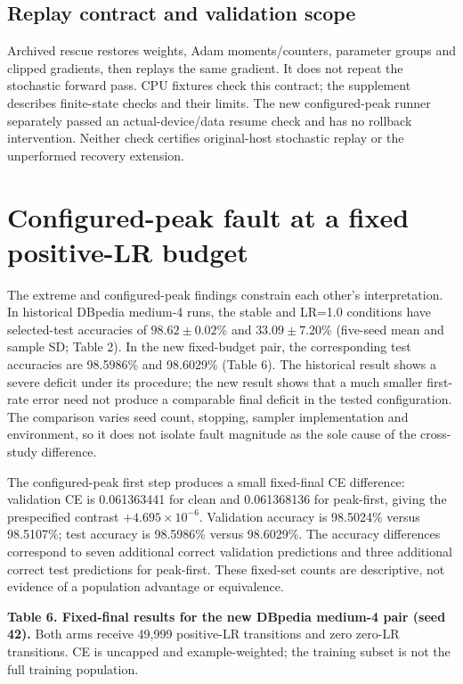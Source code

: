 \documentclass[referee,pdflatex,sn-mathphys-num]{sn-jnl}
\begin{document}
\subsection{Replay contract and validation scope}\label{replay-contract-and-validation-scope}

Archived rescue restores weights, Adam moments/counters, parameter groups and clipped gradients, then replays the same gradient. It does not repeat the stochastic forward pass. CPU fixtures check this contract; the supplement describes finite-state checks and their limits. The new configured-peak runner separately passed an actual-device/data resume check and has no rollback intervention. Neither check certifies original-host stochastic replay or the unperformed recovery extension.

\section{Configured-peak fault at a fixed positive-LR budget}\label{configured-peak-fault-at-a-fixed-positive-lr-budget}

The extreme and configured-peak findings constrain each other's interpretation. In historical DBpedia medium-4 runs, the stable and LR=1.0 conditions have selected-test accuracies of \(98.62\pm0.02\%\) and \(33.09\pm7.20\%\) (five-seed mean and sample SD; Table 2). In the new fixed-budget pair, the corresponding test accuracies are 98.5986\% and 98.6029\% (Table 6). The historical result shows a severe deficit under its procedure; the new result shows that a much smaller first-rate error need not produce a comparable final deficit in the tested configuration. The comparison varies seed count, stopping, sampler implementation and environment, so it does not isolate fault magnitude as the sole cause of the cross-study difference.

The configured-peak first step produces a small fixed-final CE difference: validation CE is 0.061363441 for clean and 0.061368136 for peak-first, giving the prespecified contrast \(+4.695\times10^{-6}\). Validation accuracy is 98.5024\% versus 98.5107\%; test accuracy is 98.5986\% versus 98.6029\%. The accuracy differences correspond to seven additional correct validation predictions and three additional correct test predictions for peak-first. These fixed-set counts are descriptive, not evidence of a population advantage or equivalence.


\textbf{Table 6. Fixed-final results for the new DBpedia medium-4 pair (seed 42).} Both arms receive 49,999 positive-LR transitions and zero zero-LR transitions. CE is uncapped and example-weighted; the training subset is not the full training population.
\end{document}
